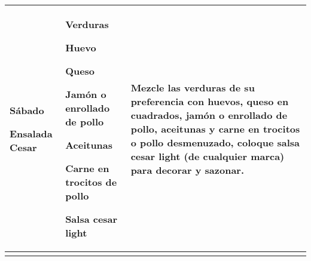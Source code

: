 \documentclass[menu.tex]{subfiles}
\begin{document}
\begin{tabular} {p{3cm} p{4.5cm} p{9cm}}
\pbox{20cm}
{
    \rule{0pt}{3ex}\begin{large}\textbf{Sábado}\end{large}\\
    \rule{0pt}{2ex}Ensalada Cesar
}& 
\vspace{-0.3cm}
\begin{compactitem} 
    \begin{footnotesize}
        \item Verduras
        \item Huevo
        \item Queso
        \item Jamón o enrollado de pollo
        \item Aceitunas
        \item Carne en trocitos de pollo
        \item Salsa cesar light
    \end{footnotesize}
\end{compactitem}&
\vspace{-0.3cm}
Mezcle las verduras de su preferencia con huevos, queso en cuadrados, jamón o enrollado de pollo, aceitunas y carne en trocitos o pollo desmenuzado, coloque salsa cesar light (de cualquier marca) para decorar y sazonar.\\ \hline
\newpage
\end{tabular}
\end{document}
